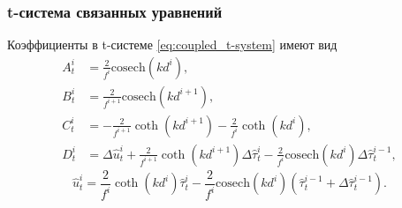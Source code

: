 \begin{frame}
    \frametitle{t-система связанных уравнений}
    Коэффициенты в t-системе \eqref{eq:coupled_t-system} имеют вид
    \begin{equation*}
        \begin{split}
            A^{i}_t &= \frac{2}{f^{i}}\text{cosech}(kd^{i}),\\
            B^{i}_t &= \frac{2}{f^{i+1}}\text{cosech}(kd^{i+1}),\\
            C^{i}_t &= -\frac{2}{f^{i+1}}\coth(kd^{i+1}) - \frac{2}{f^{i}}\coth(kd^{i}),\\
            D^{i}_t &= \Delta \hat{u}^{i}_{t} + \frac{2}{f^{i+1}}\coth(kd^{i+1})\Delta\hat{\tau}_{t}^{i} 
            - \frac{2}{f^{i}}\text{cosech}(kd^{i})\Delta\hat{\tau}_{t}^{i-1},
        \end{split}
    \end{equation*}
    \begin{equation*}
        \hat{u}^{i}_{t} = \frac{2}{f^{i}}\coth(kd^{i})\hat{\tau}^{i}_{t} - \frac{2}{f^{i}}\text{cosech}(kd^{i}) (\hat{\tau}^{i-1}_{t} + \Delta\hat{\tau}^{i-1}_{t}).
    \end{equation*}
\end{frame}

